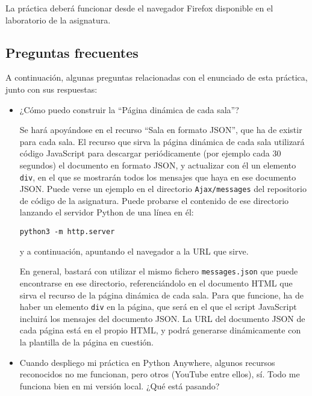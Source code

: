 La práctica deberá funcionar desde el navegador Firefox disponible en el laboratorio de la asignatura.

\subsection{Preguntas frecuentes}
\label{sec:practica-2023-05:preguntas}

A continuación, algunas preguntas relacionadas con el enunciado de esta práctica, junto con sus respuestas:

\begin{itemize}

\item ¿Cómo puedo construir la ``Página dinámica de cada sala''?

  Se hará apoyándose en el recurso ``Sala en formato JSON'', que ha de existir para cada sala. El recurso que sirva la página dinámica de cada sala utilizará código JavaScript para descargar periódicamente (por ejemplo cada 30 segundos) el documento en formato JSON, y actualizar con él un elemento \texttt{div}, en el que se mostrarán todos los mensajes que haya en ese documento JSON. Puede verse un ejemplo en el directorio \texttt{Ajax/messages} del repositorio de código de la asignatura. Puede probarse el contenido de ese directorio lanzando el servidor Python de una línea en él:

\begin{verbatim}
python3 -m http.server
\end{verbatim}

  y a continuación, apuntando el navegador a la URL que sirve.

  En general, bastará con utilizar el mismo fichero \texttt{messages.json} que puede encontrarse en ese directorio, referenciándolo en el documento HTML que sirva el recurso de la página dinámica de cada sala. Para que funcione, ha de haber un elemento \texttt{div} en la página, que será en el que el script JavaScript incluirá los mensajes del documento JSON. La URL del documento JSON de cada página está en el propio HTML, y podrá generarse dinámicamente con la plantilla de la página en cuestión.
  
\item Cuando despliego mi práctica en Python Anywhere, algunos recursos reconocidos no me funcionan, pero otros (YouTube entre ellos), sí. Todo me funciona bien en mi versión local. ¿Qué está pasando?


\end{itemize}

